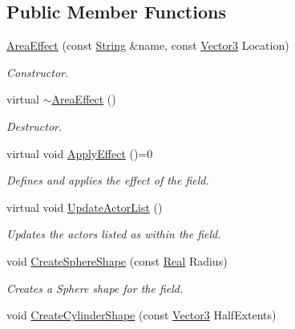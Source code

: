 \subsection*{Public Member Functions}
\begin{DoxyCompactItemize}
\item 
\hyperlink{classphys_1_1AreaEffect_af4a11385bfc07aea76d135be8a88e136}{AreaEffect} (const \hyperlink{namespacephys_aa03900411993de7fbfec4789bc1d392e}{String} \&name, const \hyperlink{classphys_1_1Vector3}{Vector3} Location)
\begin{DoxyCompactList}\small\item\em Constructor. \item\end{DoxyCompactList}\item 
virtual \hyperlink{classphys_1_1AreaEffect_aa9e6d721d337c32aa47357060d319924}{$\sim$AreaEffect} ()
\begin{DoxyCompactList}\small\item\em Destructor. \item\end{DoxyCompactList}\item 
virtual void \hyperlink{classphys_1_1AreaEffect_a3b285ecfcf9c9200662d510e48dd222a}{ApplyEffect} ()=0
\begin{DoxyCompactList}\small\item\em Defines and applies the effect of the field. \item\end{DoxyCompactList}\item 
virtual void \hyperlink{classphys_1_1AreaEffect_a0a0e6dfc6353d19b19e7bea037172072}{UpdateActorList} ()
\begin{DoxyCompactList}\small\item\em Updates the actors listed as within the field. \item\end{DoxyCompactList}\item 
void \hyperlink{classphys_1_1AreaEffect_a57399254f84ac288f74033ab609d8ffc}{CreateSphereShape} (const \hyperlink{namespacephys_af7eb897198d265b8e868f45240230d5f}{Real} Radius)
\begin{DoxyCompactList}\small\item\em Creates a Sphere shape for the field. \item\end{DoxyCompactList}\item 
void \hyperlink{classphys_1_1AreaEffect_a5bd39788f8d5eb04cd24becfa5153a6a}{CreateCylinderShape} (const \hyperlink{classphys_1_1Vector3}{Vector3} HalfExtents)

\end{DoxyCompactItemize}
